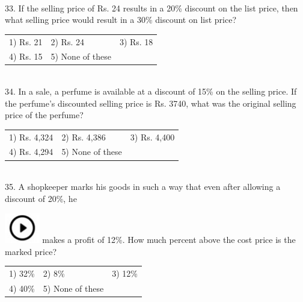 \documentclass{article}
\begin{document}
	\noindent \\  33. If the selling price of Rs. 24 results in a 20\% discount on the list price, then what selling price would result in a 30\% discount on list price?
	
	\noindent \begin{tabular}{p{1.7in} p{1.6in} p{1.6in}} \\ 
 1) Rs. 21                     & 2) Rs. 24              & 3) Rs. 18              \\
4) Rs. 15              & 5) None of these \\
\end{tabular}
	
	\noindent 
	
	\noindent 
	
	\noindent 
	
	\noindent  \\ 34. In a sale, a perfume is available at a discount of 15\% on the selling price. If the perfume's discounted selling price is Rs. 3740, what was the original selling price of the perfume?
	
	\noindent \begin{tabular}{p{1.7in} p{1.6in} p{1.6in}} \\ 
 1) Rs. 4,324                & 2) Rs. 4,386         & 3) Rs. 4,400         \\
4) Rs. 4,294         & 5) None of these \\
\end{tabular}
	
	\noindent 
	
	\noindent 
	
	\noindent \\  35. A shopkeeper marks his goods in such a way that even after allowing a discount of 20\%, he
	
	\noindent \includegraphics*[width=0.60in, height=0.52in]{images/image1} makes a profit of 12\%. How much percent above the cost price is the marked price?
	
	\noindent \begin{tabular}{p{1.7in} p{1.6in} p{1.6in}} \\ 
 1) 32\%                    & 2) 8\%                & 3) 12\%              \\
4) 40\%              & 5) None of these \\
\end{tabular}
	
\end{document}
